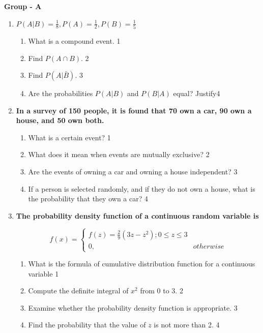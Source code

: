 \documentclass[12pt]{article}
\begin{document}
\begin{center}
\textbf{Group  - A}
\end{center}
 \begin{enumerate}

   \item
  \textbf{$P(A\vert B) = \frac 1 8, P(A) = \frac 12, P(B) = \frac 15$}
 
  \begin{enumerate}
    \item What is a compound event. \hfill 1 
    \item
    	Find $P(A\cap B)$.  \hfill 2
    \item
    	Find $P(A\vert \bar B)$. \hfill 3
     \item
     	Are the probabilities $P(A\vert B)$ and $P(B\vert A)$ equal? Justify\hfill 4
  \end{enumerate}


\item  
  \textbf{In a survey of 150 people, it is found that 70 own a car, 90 own a house, and 50 own both.}  

  \begin{enumerate}  
    \item What is a certain event? \hfill 1
    \item What does it mean when events are mutually exclusive? \hfill 2
    \item  
    	Are the events of owning a car and owning a house independent?  \hfill 3  
    \item  
    	If a person is selected randomly, and if they do not own a house, what is the probability that they own a car? \hfill 4  
  \end{enumerate}  
  
  

   \item
  \textbf{The probability density function of a continuous random variable is}

$$
  f(x) =
\begin{cases}
f(z) = \frac29 (3z-z^2); 0 \le z \le 3 \\
0, & otherwise
\end{cases}
$$
  
  \begin{enumerate}
    \item What is the formula of cumulative distribution function for a continuous variable \hfill 1
    \item Compute the definite integral of \( x^2 \) from 0 to 3. \hfill 2
    \item  
	Examine whether the probability density function is appropriate. \hfill 3
    \item
	Find the probability that the value of $z$ is not more than 2. \hfill 4
  \end{enumerate}
  




\end{enumerate}
\end{document}
